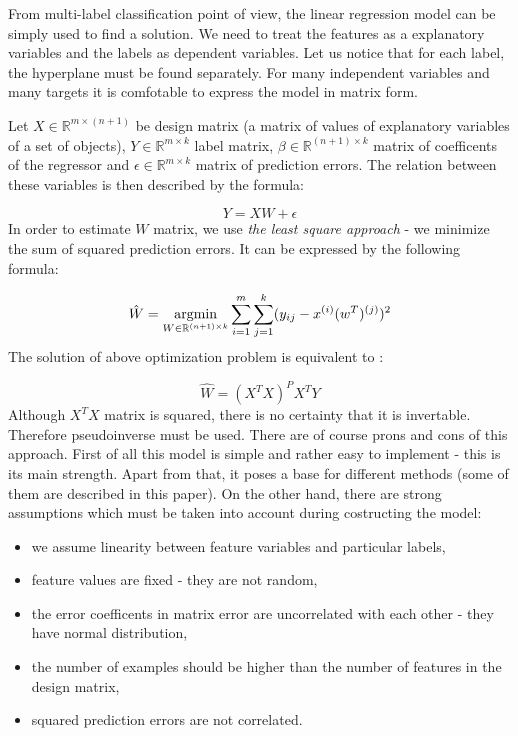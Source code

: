From multi-label classification point of view, the linear regression model can be simply used to find a solution. We need to treat the features as a explanatory variables and the labels as dependent variables. Let us notice that for each label, the hyperplane must be found separately. For many independent variables and many targets it is comfotable to express the model in matrix form.  

Let $X \in \mathbb{R}^{m \times  ( n+1 )}$ be design matrix (a matrix of values of explanatory variables of a set of objects), $Y \in \mathbb{R}^{m \times k}$ label matrix, $\beta \in \mathbb{R}^{(n+1) \times k}$ matrix of coefficents of the regressor and $\epsilon \in \mathbb{R}^{m \times k}$ matrix of prediction errors. The relation between these variables is then described by the formula:

\begin{equation}\label{eq:LR1}
    Y = XW + \epsilon 
\end{equation}
In order to estimate $W$ matrix, we use \textit{the least square approach} - we minimize the sum of squared prediction errors. It can be expressed by the following formula:

\begin{equation}\label{eq:LR2}
    \hat{W} = \operatorname*{argmin}_{W \in \mathbb{R}^{(n+1) \times k}}\sum\limits_{i=1}^{m}\sum\limits_{j=1}^{k}(y_{ij}-x^{(i)}(w^T)^{(j)})^2
\end{equation}
The solution of above optimization problem is equivalent to \cite{Weisberg}:

\begin{equation}\label{eq:LR3}
    \hat{W} = (X^TX)^{P}X^TY
\end{equation}
Although $X^TX$ matrix is squared, there is no certainty that it is invertable. Therefore pseudoinverse must be used. There are of course prons and cons of this approach. First of all this model is simple and rather easy to implement - this is its main strength. Apart from that, it poses a base for different methods (some of them are described in this paper). On the other hand, there are strong assumptions which must be taken into account during costructing the model:

\begin{itemize}
    \item we assume linearity between feature variables and particular labels,
    \item feature values are fixed - they are not random,
    \item the error coefficents in matrix error are uncorrelated with each other - they have normal distribution,
    \item the number of examples should be higher than the number of features in the design matrix,
    \item squared prediction errors are not correlated.
\end{itemize}

